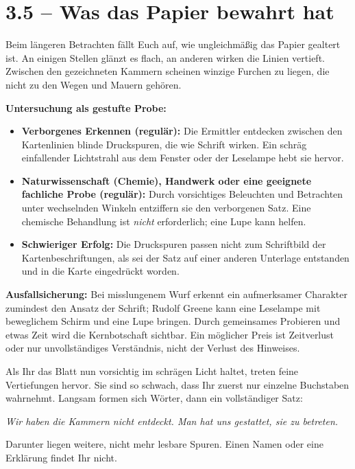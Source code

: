\section{3.5 -- Was das Papier bewahrt hat}
\begin{vorlesetextalle}
Beim längeren Betrachten fällt Euch auf, wie ungleichmä\ss{}ig das Papier gealtert ist. An einigen Stellen glänzt es flach, an anderen wirken die Linien vertieft. Zwischen den gezeichneten Kammern scheinen winzige Furchen zu liegen, die nicht zu den Wegen und Mauern gehören.
\end{vorlesetextalle}
\begin{meisterinfo}
\textbf{Untersuchung als gestufte Probe:}
\begin{itemize}
\item \textbf{Verborgenes Erkennen (regulär):} Die Ermittler entdecken zwischen den Kartenlinien blinde Druckspuren, die wie Schrift wirken. Ein schräg einfallender Lichtstrahl aus dem Fenster oder der Leselampe hebt sie hervor.
\item \textbf{Naturwissenschaft (Chemie), Handwerk oder eine geeignete fachliche Probe (regulär):} Durch vorsichtiges Beleuchten und Betrachten unter wechselnden Winkeln entziffern sie den verborgenen Satz. Eine chemische Behandlung ist \emph{nicht} erforderlich; eine Lupe kann helfen.
\item \textbf{Schwieriger Erfolg:} Die Druckspuren passen nicht zum Schriftbild der Kartenbeschriftungen, als sei der Satz auf einer anderen Unterlage entstanden und in die Karte eingedrückt worden.
\end{itemize}
\textbf{Ausfallsicherung:} Bei misslungenem Wurf erkennt ein aufmerksamer Charakter zumindest den Ansatz der Schrift; Rudolf Greene kann eine Leselampe mit beweglichem Schirm und eine Lupe bringen. Durch gemeinsames Probieren und etwas Zeit wird die Kernbotschaft sichtbar. Ein möglicher Preis ist Zeitverlust oder nur unvollständiges Verständnis, nicht der Verlust des Hinweises.
\end{meisterinfo}
\begin{vorlesetextalle}
Als Ihr das Blatt nun vorsichtig im schrägen Licht haltet, treten feine Vertiefungen hervor. Sie sind so schwach, dass Ihr zuerst nur einzelne Buchstaben wahrnehmt. Langsam formen sich Wörter, dann ein vollständiger Satz:

\begin{center}\itshape
\glqq{}Wir haben die Kammern nicht entdeckt. Man hat uns gestattet, sie zu betreten.\grqq{}
\end{center}

Darunter liegen weitere, nicht mehr lesbare Spuren. Einen Namen oder eine Erklärung findet Ihr nicht.
\end{vorlesetextalle}

